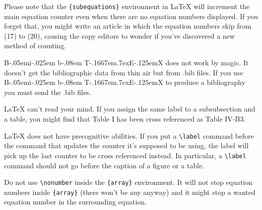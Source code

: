 \documentclass[a4paper, 10pt, conference]{ieeeconf}      %
\def\BibTeX{{\rm B\kern-.05em{\sc i\kern-.025em b}\kern-.08em
    T\kern-.1667em\lower.7ex\hbox{E}\kern-.125emX}}
\begin{document}
Please note that the \verb|{subequations}| environment in {\LaTeX}
will increment the main equation counter even when there are no
equation numbers displayed. If you forget that, you might write an
article in which the equation numbers skip from (17) to (20), causing
the copy editors to wonder if you've discovered a new method of
counting.

{\BibTeX} does not work by magic. It doesn't get the bibliographic
data from thin air but from .bib files. If you use {\BibTeX} to produce a
bibliography you must send the .bib files. 

{\LaTeX} can't read your mind. If you assign the same label to a
subsubsection and a table, you might find that Table I has been cross
referenced as Table IV-B3. 

{\LaTeX} does not have precognitive abilities. If you put a
\verb|\label| command before the command that updates the counter it's
supposed to be using, the label will pick up the last counter to be
cross referenced instead. In particular, a \verb|\label| command
should not go before the caption of a figure or a table.

Do not use \verb|\nonumber| inside the \verb|{array}| environment. It
will not stop equation numbers inside \verb|{array}| (there won't be
any anyway) and it might stop a wanted equation number in the
surrounding equation.
\end{document}
